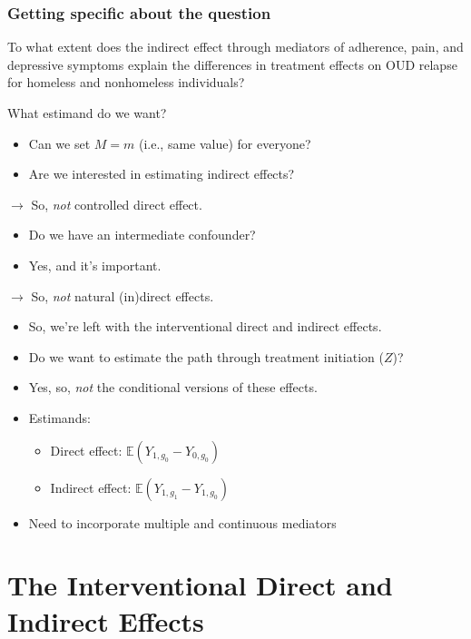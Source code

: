 \documentclass[
  12pt, krantz2,
]{book}
\providecommand{\tightlist}{%
  \setlength{\itemsep}{0pt}\setlength{\parskip}{0pt}}
\theoremstyle{definition}
\theoremstyle{definition}
\theoremstyle{definition}
\newcommand{\E}{\mathbb{E}}
\newcommand{\1}{\mathbbm{1}}
\begin{document}
\hypertarget{getting-specific-about-the-question}{%
\subsection{Getting specific about the question}\label{getting-specific-about-the-question}}

To what extent does the indirect effect through mediators of adherence, pain,
and depressive symptoms explain the differences in treatment effects on OUD
relapse for homeless and nonhomeless individuals?

What estimand do we want?

\begin{itemize}
\tightlist
\item
  Can we set \(M=m\) (i.e., same value) for everyone?
\item
  Are we interested in estimating indirect effects?
\end{itemize}

\(\rightarrow\) So, \emph{not} controlled direct effect.

\begin{itemize}
\tightlist
\item
  Do we have an intermediate confounder?
\item
  Yes, and it's important.
\end{itemize}

\(\rightarrow\) So, \emph{not} natural (in)direct effects.

\begin{itemize}
\tightlist
\item
  So, we're left with the interventional direct and indirect effects.
\item
  Do we want to estimate the path through treatment initiation (\(Z\))?
\item
  Yes, so, \emph{not} the conditional versions of these effects.
\item
  Estimands:

  \begin{itemize}
  \tightlist
  \item
    Direct effect: \(\E(Y_{1,g_0} - Y_{0,g_0})\)
  \item
    Indirect effect: \(\E(Y_{1,g_1} - Y_{1,g_0})\)
  \end{itemize}
\item
  Need to incorporate multiple and continuous mediators
\end{itemize}

\hypertarget{interventional}{%
\chapter{The Interventional Direct and Indirect Effects}\label{interventional}}
\end{document}
